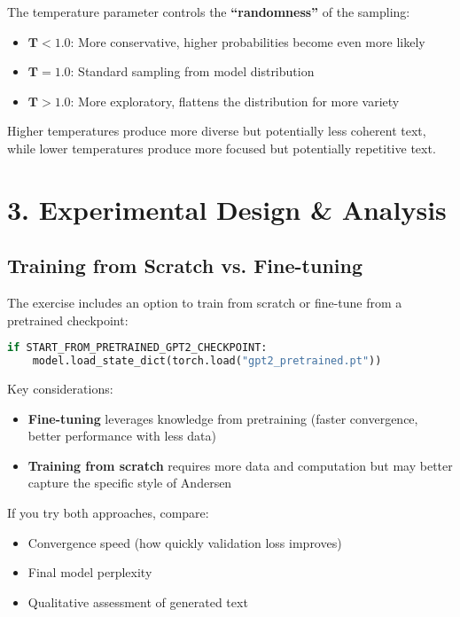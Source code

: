 The temperature parameter controls the \textbf{``randomness''} of the sampling:

\begin{itemize}
    \item $\mathbf{T < 1.0}$: More conservative, higher probabilities become even more likely
    \item $\mathbf{T = 1.0}$: Standard sampling from model distribution
    \item $\mathbf{T > 1.0}$: More exploratory, flattens the distribution for more variety
\end{itemize}

Higher temperatures produce more diverse but potentially less coherent text, while lower temperatures produce more focused but potentially repetitive text.
\section*{3. Experimental Design \& Analysis}

\subsection*{Training from Scratch vs. Fine-tuning}

The exercise includes an option to train from scratch or fine-tune from a pretrained checkpoint:

\begin{lstlisting}[language=Python]
if START_FROM_PRETRAINED_GPT2_CHECKPOINT:
    model.load_state_dict(torch.load("gpt2_pretrained.pt"))
\end{lstlisting}

Key considerations:

\begin{itemize}
    \item \textbf{Fine-tuning} leverages knowledge from pretraining (faster convergence, better performance with less data)
    \item \textbf{Training from scratch} requires more data and computation but may better capture the specific style of Andersen
\end{itemize}

If you try both approaches, compare:

\begin{itemize}
    \item Convergence speed (how quickly validation loss improves)
    \item Final model perplexity
    \item Qualitative assessment of generated text
\end{itemize}

